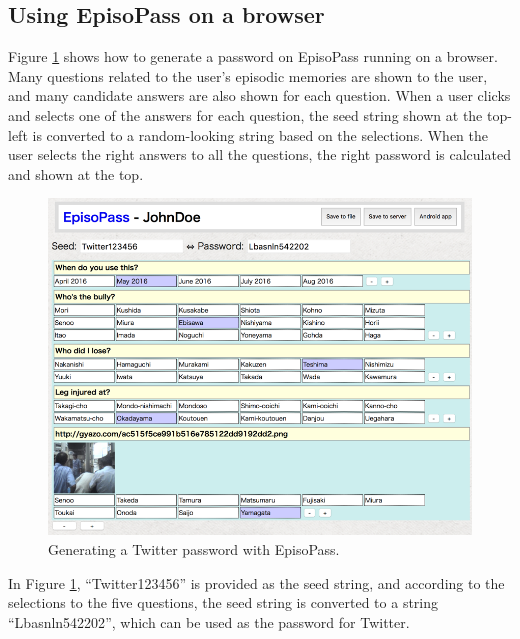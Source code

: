 \documentclass[runningheads,a4paper]{llncs}
\begin{document}
\subsection{Using EpisoPass on a browser}

Figure \ref{web1} shows how to generate a password
on EpisoPass running on a browser.
Many questions related to the user's episodic memories are shown to the user,
and many candidate answers are also shown for each question.
When a user clicks and selects one of the answers for each question,
the seed string shown at the top-left is converted to a random-looking string
based on the selections.
When the user selects the right answers to all the questions,
the right password is calculated and shown at the top.


\begin{figure}[t]
\centering
\includegraphics[width=1.0\columnwidth]{figures/c1bd6e7f67698c70978f528ccd2339d9}
\caption{Generating a Twitter password with EpisoPass.}
\label{web1}
\end{figure}

In Figure \ref{web1},
``\textsf{Twitter123456}'' is provided as the seed string,
and according to the selections to the five questions,
the seed string is converted to a string
``\textsf{Lbasnln542202}'',
which can be used as the password for Twitter.
\end{document}

